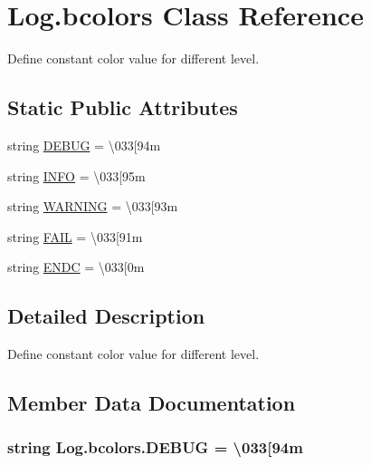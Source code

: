 \hypertarget{class_log_1_1bcolors}{}\section{Log.\+bcolors Class Reference}
\label{class_log_1_1bcolors}


Define constant color value for different level.  


\subsection*{Static Public Attributes}
\begin{DoxyCompactItemize}
\item 
string \hyperlink{class_log_1_1bcolors_a7f033a43cfe4ec81605121c01d223f31}{D\+E\+B\+U\+G} = \textquotesingle{}\textbackslash{}033\mbox{[}94m \textquotesingle{}
\item 
string \hyperlink{class_log_1_1bcolors_abebeed8fb41205fcff45bfa1f5c03c0a}{I\+N\+F\+O} = \textquotesingle{} \textbackslash{}033\mbox{[}95m \textquotesingle{}
\item 
string \hyperlink{class_log_1_1bcolors_a709fba90e14f4a669bd94711df53665e}{W\+A\+R\+N\+I\+N\+G} = \textquotesingle{} \textbackslash{}033\mbox{[}93m \textquotesingle{}
\item 
string \hyperlink{class_log_1_1bcolors_a998357f4b91b221875352c09c8482d59}{F\+A\+I\+L} = \textquotesingle{} \textbackslash{}033\mbox{[}91m \textquotesingle{}
\item 
string \hyperlink{class_log_1_1bcolors_a15ad99f841e6570687d302f7b7828acc}{E\+N\+D\+C} = \textquotesingle{} \textbackslash{}033\mbox{[}0m \textquotesingle{}
\end{DoxyCompactItemize}


\subsection{Detailed Description}
Define constant color value for different level. 

\subsection{Member Data Documentation}
\hypertarget{class_log_1_1bcolors_a7f033a43cfe4ec81605121c01d223f31}{}
\subsubsection[{D\+E\+B\+U\+G}]{\setlength{\rightskip}{0pt plus 5cm}string Log.\+bcolors.\+D\+E\+B\+U\+G = \textquotesingle{}\textbackslash{}033\mbox{[}94m \textquotesingle{}\hspace{0.3cm}{\ttfamily [static]}}\label{class_log_1_1bcolors_a7f033a43cfe4ec81605121c01d223f31}
\hypertarget{class_log_1_1bcolors_a15ad99f841e6570687d302f7b7828acc}{}
